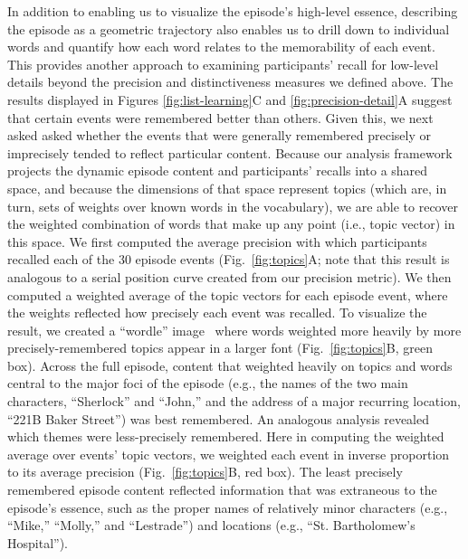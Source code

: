 \documentclass[10pt]{article}
\begin{document}
In addition to enabling us to visualize the episode's high-level essence, describing the episode as a geometric trajectory also enables us to drill down to individual words and quantify how each word relates to the memorability of each event.  This provides another approach to examining participants' recall for low-level details beyond the precision and distinctiveness measures we defined above.  The results displayed in Figures \ref{fig:list-learning}C and \ref{fig:precision-detail}A suggest that certain events were remembered better than others.  Given this, we next asked asked whether the events that were generally remembered precisely or imprecisely tended to reflect particular content.  Because our analysis framework projects the dynamic episode content and participants' recalls into a shared space, and because the dimensions of that space represent topics (which are, in turn, sets of weights over known words in the vocabulary), we are able to recover the weighted combination of words that make up any point (i.e., topic vector) in this space.  We first computed the average precision with which participants recalled each of the 30 episode events (Fig.~\ref{fig:topics}A; note that this result is analogous to a serial position curve created from our precision metric).  We then computed a weighted average of the topic vectors for each episode event, where the weights reflected how precisely each event was recalled.  To visualize the result, we created a ``wordle'' image~\citep{MuelEtal18} where words weighted more heavily by more precisely-remembered topics appear in a larger font (Fig.~\ref{fig:topics}B, green box).  Across the full episode, content that weighted heavily on topics and words central to the major foci of the episode (e.g., the names of the two main characters, ``Sherlock'' and ``John,'' and the address of a major recurring location, ``221B Baker Street'') was best remembered.  An analogous analysis revealed which themes were less-precisely remembered.  Here in computing the weighted average over events' topic vectors, we weighted each event in inverse proportion to its average precision (Fig.~\ref{fig:topics}B, red box).  The least precisely remembered episode content reflected information that was extraneous to the episode's essence, such as the proper names of relatively minor characters (e.g., ``Mike,'' ``Molly,'' and ``Lestrade'') and locations (e.g., ``St. Bartholomew's Hospital'').
\end{document}
